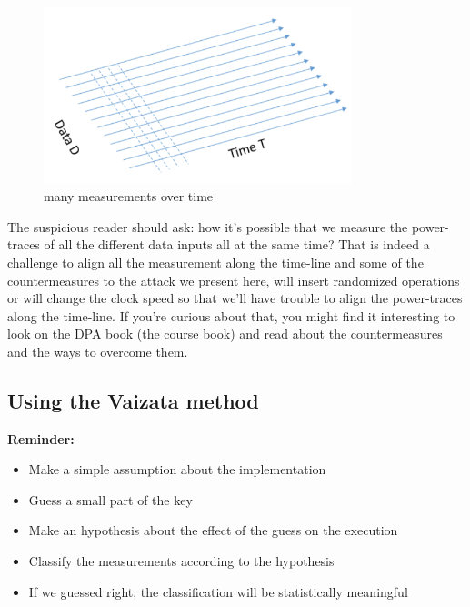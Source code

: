 \begin{figure}[!ht]
    \centering
    \includegraphics[width=0.8\textwidth]{images/Lecture6/DPA_Illustration.png}
    \caption{many measurements over time} \label{fig:DPA_Illustration}
\end{figure}

The suspicious reader should ask: how it's possible that we measure the
power-traces of all the different data inputs all at the same time? That is
indeed a challenge to align all the measurement along the time-line and some of
the countermeasures to the attack we present here, will insert randomized
operations or will change the clock speed so that we'll have trouble to align
the power-traces along the time-line. If you're curious about that, you might
find it interesting to look on the DPA book (the course book) and read about the
countermeasures and the ways to overcome them.

\subsection{Using the Vaizata method}

\textbf{Reminder:}
	
\begin{itemize}
\item Make a {simple assumption} about the implementation
\item Guess a {small part} of the key
\item Make an {hypothesis} about the effect of the guess on the execution
\item {Classify the measurements} according to the hypothesis
\item If we guessed right, the classification will be {statistically meaningful}
\end{itemize}


